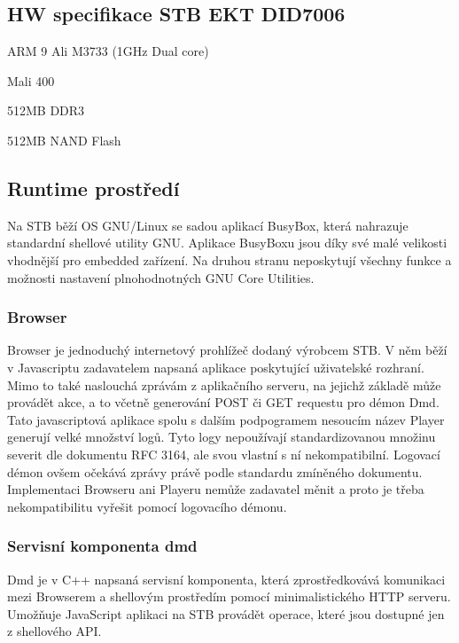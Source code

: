 \documentclass[thesis=B,czech]{FITthesis}[2012/06/26]
\begin{document}
\subsection{HW specifikace STB EKT DID7006}
\begin{description}
\setlength\itemsep{-1ex}
  \item [CPU:] ARM 9 Ali M3733 (1GHz Dual core)
  \item [GPU:] Mali 400
  \item [RAM:] 512MB DDR3
  \item [Perzistentní paměť:] 512MB NAND Flash
\end{description}

\subsection{Runtime prostředí}
Na STB běží OS GNU/Linux se sadou aplikací BusyBox, která nahrazuje standardní shellové utility GNU. Aplikace BusyBoxu jsou díky své malé velikosti vhodnější pro embedded zařízení. Na druhou stranu neposkytují všechny funkce a možnosti nastavení plnohodnotných GNU Core Utilities.

\subsubsection{Browser}
Browser je jednoduchý internetový prohlížeč dodaný výrobcem STB.
V něm běží v Javascriptu zadavatelem napsaná aplikace poskytující uživatelské rozhraní. Mimo to také naslouchá zprávám z aplikačního serveru, na jejichž základě může provádět akce, a to včetně generování POST či GET requestu pro démon Dmd.
Tato javascriptová aplikace spolu s dalším podpogramem nesoucím název Player generují velké množství logů. Tyto logy nepoužívají standardizovanou množinu severit dle dokumentu RFC 3164, ale svou vlastní s ní nekompatibilní. Logovací démon ovšem očekává zprávy právě podle standardu zmíněného dokumentu. Implementaci Browseru ani Playeru nemůže zadavatel měnit a proto je třeba nekompatibilitu vyřešit pomocí logovacího démonu.

\subsubsection{Servisní komponenta dmd}
Dmd je v C++ napsaná servisní komponenta, která zprostředkovává komunikaci mezi Browserem a shellovým prostředím pomocí minimalistického HTTP serveru. Umožňuje JavaScript aplikaci na STB provádět operace, které jsou dostupné jen z shellového API.
\end{document}
